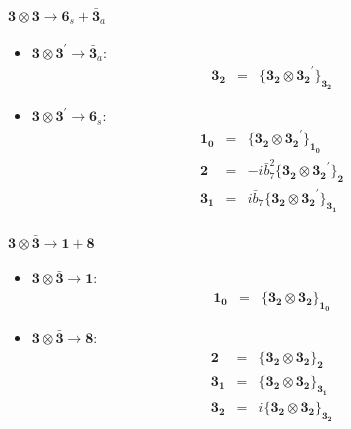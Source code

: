 \documentclass[english]{article}
\newcommand{\subcg}[3]{\big\{ {#1}\otimes{#2}\big\}^{}_{#3}}
\newcommand{\rep}[1]{\mathbf{#1}}
\begin{document}
\paragraph*{\Large $\rep{3}\otimes\rep{3}\to\rep{6}_s+\rep{\bar{3}}_a$}
\begin{itemize}
\item $\rep{3}\otimes\rep{3}^{\prime}\to\rep{\bar{3}}_{a}$:
\begin{eqnarray*}
\rep{3_2} &=& \subcg{\rep{3_2}}{\rep{3_2}^{\prime}}{\rep{3_2}}
\end{eqnarray*}
\item $\rep{3}\otimes\rep{3}^{\prime}\to\rep{6}_{s}$:
\begin{eqnarray*}
\rep{1_0} &=& \subcg{\rep{3_2}}{\rep{3_2}^{\prime}}{\rep{1_0}}
\\
\rep{2} &=& -i \bar{b}_7^2\subcg{\rep{3_2}}{\rep{3_2}^{\prime}}{\rep{2}}
\\
\rep{3_1} &=& i \bar{b}_7\subcg{\rep{3_2}}{\rep{3_2}^{\prime}}{\rep{3_1}}
\end{eqnarray*}
\end{itemize}
\paragraph*{\Large $\rep{3}\otimes\rep{\bar{3}}\to\rep{1}+\rep{8}$}
\begin{itemize}
\item $\rep{3}\otimes\rep{\bar{3}}\to\rep{1}$:
\begin{eqnarray*}
\rep{1_0} &=& \subcg{\rep{3_2}}{\rep{3_2}}{\rep{1_0}}
\end{eqnarray*}
\item $\rep{3}\otimes\rep{\bar{3}}\to\rep{8}$:
\begin{eqnarray*}
\rep{2} &=& \subcg{\rep{3_2}}{\rep{3_2}}{\rep{2}}
\\
\rep{3_1} &=& \subcg{\rep{3_2}}{\rep{3_2}}{\rep{3_1}}
\\
\rep{3_2} &=& i\subcg{\rep{3_2}}{\rep{3_2}}{\rep{3_2}}
\end{eqnarray*}
\end{itemize}
\end{document}
